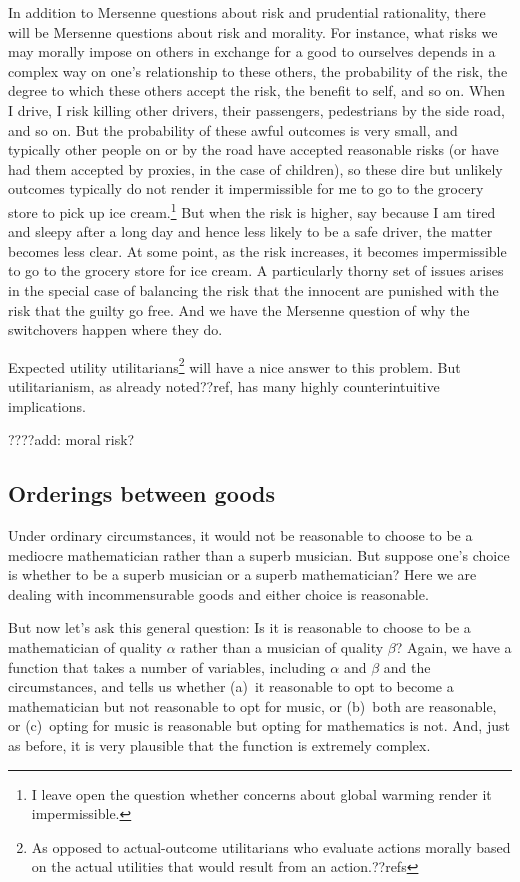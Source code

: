 In addition to Mersenne questions about risk and prudential rationality, there will be Mersenne questions about risk and morality.
For instance, what risks we may morally impose on others in exchange for a good to ourselves depends in a complex way 
on one's relationship to these others, the probability of the risk, the degree to which these others accept the risk, the 
benefit to self, and so on. When I drive, I risk killing other drivers, their passengers, pedestrians by the side road, and so on.
But the probability of these awful outcomes is very small, and typically other people on or by the road have accepted reasonable
risks (or have had them accepted by proxies, in the case of children), so these dire but unlikely outcomes typically do not render it impermissible for
me to go to the grocery store to pick up ice cream.\footnote{I leave open the question whether concerns about global warming 
render it impermissible.} But when the risk is higher, say because I am tired and sleepy after a long day and hence less likely to be
a safe driver, the matter becomes less clear. At some point, as the risk increases, it becomes impermissible to go to the grocery
store for ice cream. 
A particularly thorny set of issues arises in the special case of balancing the risk that the innocent are punished with the risk that the guilty go free.
And we have the Mersenne question of why the switchovers happen where they do.

Expected utility utilitarians\footnote{As opposed to actual-outcome utilitarians who evaluate actions morally based on the
actual utilities that would result from an action.??refs} will have a nice answer to this problem. But utilitarianism, as already
noted??ref, has many highly counterintuitive implications. 

????add: moral risk?

\subsection{Orderings between goods}
Under ordinary circumstances, it would not be reasonable to choose to be a mediocre mathematician rather than a superb musician. 
But suppose one's choice is whether to be a superb
musician or a superb mathematician? Here we are dealing with incommensurable goods and either choice is reasonable.

But now let's ask this general question: Is it is reasonable to choose to be a mathematician of quality $\alpha$ rather than
a musician of quality $\beta$? Again, we have a function that takes a number of variables, including $\alpha$ and $\beta$
and the circumstances, and tells us whether (a)~it reasonable to opt to become a mathematician but not reasonable to opt for
music, or (b)~both are reasonable, or (c)~opting for music is reasonable but opting for mathematics is not. And, just as before,
it is very plausible that the function is extremely complex.

